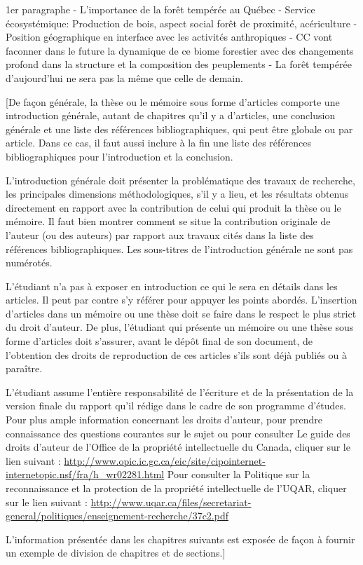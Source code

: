 \begin{sloppypar}


1er paragraphe
- L'importance de la forêt tempérée au Québec
	- Service écosystémique: Production de bois, aspect social forêt de proximité, acériculture
	- Position géographique en interface avec les activités anthropiques
	- CC vont faconner dans le future la dynamique de ce biome forestier avec des changements profond dans la structure et la composition des peuplements
	- La forêt tempérée d'aujourd'hui ne sera pas la même que celle de demain.


[De façon générale, la thèse ou le mémoire sous forme d’articles comporte une introduction générale,
autant de chapitres qu’il y a d’articles, une conclusion générale et une liste des références
bibliographiques, qui peut être globale ou par article. Dans ce cas, il faut aussi inclure à la fin
une liste des références bibliographiques pour l’introduction et la conclusion.

L’introduction générale doit présenter la problématique des travaux de recherche, les principales
dimensions méthodologiques, s'il y a lieu, et les résultats obtenus directement en rapport avec la
contribution de celui qui produit la thèse ou le mémoire. Il faut bien montrer comment se situe la
contribution originale de l'auteur (ou des auteurs) par rapport aux travaux cités dans la liste des
références bibliographiques. Les sous-titres de l’introduction générale ne sont pas numérotés.

L'étudiant n'a pas à exposer en introduction ce qui le sera en détails dans les articles. Il peut
par contre s’y référer pour appuyer les points abordés. L’insertion d’articles dans un mémoire ou
une thèse doit se faire dans le respect le plus strict du droit d’auteur. De plus, l'étudiant qui
présente un mémoire ou une thèse sous forme d’articles doit s'assurer, avant le dépôt final de son
document, de l'obtention des droits de reproduction de ces articles s'ils sont déjà publiés ou à
paraître.

L'étudiant assume l'entière responsabilité de l'écriture et de la présentation de la version finale
du rapport qu'il rédige dans le cadre de son programme d'études. Pour plus ample information
concernant les droits d’auteur, pour prendre connaissance des questions courantes sur le sujet ou
pour consulter Le guide des droits d’auteur de l’Office de la propriété intellectuelle du Canada,
cliquer sur le lien suivant :
\url{http://www.opic.ic.gc.ca/eic/site/cipointernet-internetopic.nsf/fra/h_wr02281.html}
Pour consulter la Politique sur la reconnaissance et la protection de la propriété intellectuelle de l’UQAR, cliquer sur le lien suivant :
\url{http://www.uqar.ca/files/secretariat-general/politiques/enseignement-recherche/37c2.pdf}

L’information présentée dans les chapitres suivants est exposée de façon à fournir un exemple de
division de chapitres et de sections.]
\end{sloppypar}

